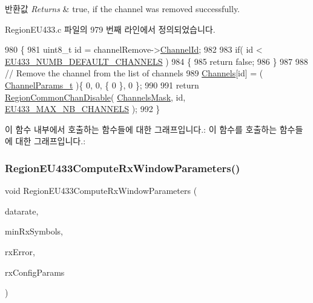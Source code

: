 \begin{DoxyRetVals}{반환값}
{\em Returns} & true, if the channel was removed successfully. \\
\hline
\end{DoxyRetVals}


Region\+E\+U433.\+c 파일의 979 번째 라인에서 정의되었습니다.


\begin{DoxyCode}
980 \{
981     uint8\_t \textcolor{keywordtype}{id} = channelRemove->\mbox{\hyperlink{structs_channel_remove_params_ae23f953dc29c360e56a3c856404a3276}{ChannelId}};
982 
983     \textcolor{keywordflow}{if}( \textcolor{keywordtype}{id} < \mbox{\hyperlink{group___r_e_g_i_o_n_e_u433_ga5458d9fd6043a733e6a28f5f30ace167}{EU433\_NUMB\_DEFAULT\_CHANNELS}} )
984     \{
985         \textcolor{keywordflow}{return} \textcolor{keyword}{false};
986     \}
987 
988     \textcolor{comment}{// Remove the channel from the list of channels}
989     \mbox{\hyperlink{_region_e_u433_8c_a989ac3355f1ed5b534b3940af3deeb14}{Channels}}[id] = ( \mbox{\hyperlink{group___l_o_r_a_m_a_c_ga1360ca6f82c6d125ea43a9dad9b56184}{ChannelParams\_t}} )\{ 0, 0, \{ 0 \}, 0 \};
990 
991     \textcolor{keywordflow}{return} \mbox{\hyperlink{group___r_e_g_i_o_n_c_o_m_m_o_n_ga695c0ab2a06edcae5b33772f639fb676}{RegionCommonChanDisable}}( \mbox{\hyperlink{_region_e_u433_8c_a2188957b5ca6af8092154d7ccbfa5757}{ChannelsMask}}, \textcolor{keywordtype}{id}, 
      \mbox{\hyperlink{group___r_e_g_i_o_n_e_u433_ga800fbd07b871c93758364a0311b87937}{EU433\_MAX\_NB\_CHANNELS}} );
992 \}
\end{DoxyCode}
이 함수 내부에서 호출하는 함수들에 대한 그래프입니다.\+:
이 함수를 호출하는 함수들에 대한 그래프입니다.\+:
\mbox{\label{group___r_e_g_i_o_n_e_u433_ga5e88bc1903bb61a90df88fe8c1805705}} 
\subsubsection{\texorpdfstring{Region\+E\+U433\+Compute\+Rx\+Window\+Parameters()}{RegionEU433ComputeRxWindowParameters()}}
{\footnotesize\ttfamily void Region\+E\+U433\+Compute\+Rx\+Window\+Parameters (\begin{DoxyParamCaption}\item[{int8\+\_\+t}]{datarate,  }\item[{uint8\+\_\+t}]{min\+Rx\+Symbols,  }\item[{uint32\+\_\+t}]{rx\+Error,  }\item[{\mbox{\hyperlink{group___r_e_g_i_o_n_ga375c038078dfcfc7ef14280021db719e}{Rx\+Config\+Params\+\_\+t}} $\ast$}]{rx\+Config\+Params }\end{DoxyParamCaption})}

